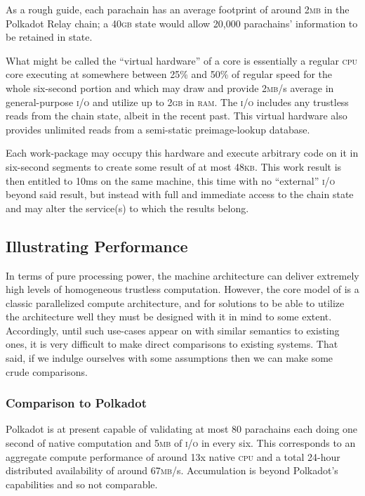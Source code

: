 As a rough guide, each parachain has an average footprint of around 2\textsc{mb} in the Polkadot Relay chain; a 40\textsc{gb} state would allow 20,000 parachains' information to be retained in state.

What might be called the ``virtual hardware'' of a \Jam core is essentially a regular \textsc{cpu} core executing at somewhere between 25\% and 50\% of regular speed for the whole six-second portion and which may draw and provide 2\textsc{mb}/s average in general-purpose \textsc{i/o} and utilize up to 2\textsc{gb} in \textsc{ram}. The \textsc{i/o} includes any trustless reads from the \Jam chain state, albeit in the recent past. This virtual hardware also provides unlimited reads from a semi-static preimage-lookup database.

Each work-package may occupy this hardware and execute arbitrary code on it in six-second segments to create some result of at most 48\textsc{kb}. This work result is then entitled to 10ms on the same machine, this time with no ``external'' \textsc{i/o} beyond said result, but instead with full and immediate access to the \Jam chain state and may alter the service(s) to which the results belong.

\subsection{Illustrating Performance}

In terms of pure processing power, the \Jam machine architecture can deliver extremely high levels of homogeneous trustless computation. However, the core model of \Jam is a classic parallelized compute architecture, and for solutions to be able to utilize the architecture well they must be designed with it in mind to some extent. Accordingly, until such use-cases appear on \Jam with similar semantics to existing ones, it is very difficult to make direct comparisons to existing systems. That said, if we indulge ourselves with some assumptions then we can make some crude comparisons.

\subsubsection{Comparison to Polkadot}
Polkadot is at present capable of validating at most 80 parachains each doing one second of native computation and 5\textsc{mb} of \textsc{i/o} in every six. This corresponds to an aggregate compute performance of around 13x native \textsc{cpu} and a total 24-hour distributed availability of around 67\textsc{mb}/s. Accumulation is beyond Polkadot's capabilities and so not comparable.

